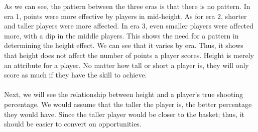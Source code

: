 \documentclass[11pt,letterpaper]{amsart}
\begin{document}
\indent As we can see, the pattern between the three eras is that there is no pattern. In era 1, points were more effective by players in mid-height. As for era 2, shorter and taller players were more affected. In era 3, even smaller players were affected more, with a dip in the middle players. This shows the need for a pattern in determining the height effect. We can see that it varies by era. Thus, it shows that height does not affect the number of points a player scores. Height is merely an attribute for a player. No matter how tall or short a player is, they will only score as much if they have the skill to achieve.\\\\
\indent Next, we will see the relationship between height and a player’s true shooting percentage. We would assume that the taller the player is, the better percentage they would have. Since the taller player would be closer to the basket; thus, it should be easier to convert on opportunities.
\end{document}

